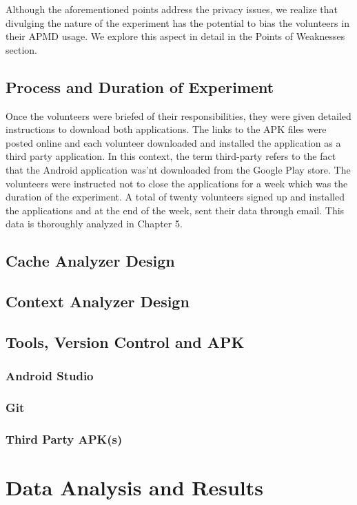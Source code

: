\documentclass[12pt]{uthesis-v12}  %
\begin{document}
			Although the aforementioned points address the privacy issues, we realize that divulging the nature of the experiment has the potential to bias the volunteers in their APMD usage. We explore this aspect in detail in the Points of Weaknesses section. 
	
	\section{Process and Duration of Experiment}
		Once the volunteers were briefed of their responsibilities, they were given detailed instructions to download both applications. The links to the APK files were posted online and each volunteer downloaded and installed the application as a third party application. In this context, the term third-party refers to the fact that the Android application was'nt downloaded from the Google Play store. The volunteers were instructed not to close the applications for a week which was the duration of the experiment. A total of twenty volunteers signed up and installed the applications and at the end of the week, sent their data through email. This data is thoroughly analyzed in Chapter 5. 
	\section{Cache Analyzer Design}
	
	\section{Context Analyzer Design}
	
	\section{Tools, Version Control and APK}
		
		\subsection{Android Studio}
		
		\subsection{Git}
		
		\subsection{Third Party APK(s)}

\chapter{Data Analysis and Results}
	
\end{document}

